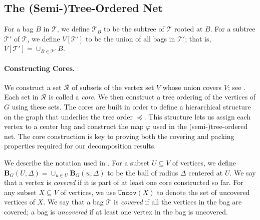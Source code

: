 \documentclass{article}
\newcommand{\mt}{\mathcal{T}}
\def\coreSet{\mathcal{R}}
\def\uncovset{\mathtt{Uncov}}
\def\ball{\mathbf{B}}
\begin{document}
\subsection{The (Semi-)Tree-Ordered Net}\label{subsec:semi-tree-ordered}

 For a bag $B$ in $\mathcal{T}$, we define $\mt_B$ to be the subtree of $\mt$ rooted at $B$. For a subtree $\mt'$ of $\mathcal{T}$, we define $V[\mt']$ to be the union of all bags in $\mt'$; that is, $ V[\mt'] = \cup_{B\in \mt'}B$. 

\medskip
\hypertarget{alg:vertexOrdering}{\paragraph*{Constructing Cores.~}} We construct a set $\coreSet$ of subsets of the vertex set $V$ whose union covers $V$; see .  Each set in $\coreSet$ is called a \emph{core}. We then construct a tree ordering of the vertices of $G$ using these sets. The cores are built in order to define a hierarchical structure on the graph that underlies the tree order $\preceq$. This structure lets us assign each vertex to a center bag and construct the map $\varphi$ used in the (semi-)tree-ordered net. The core construction is key to proving both the covering and packing properties required for our decomposition results.

We describe the notation used in .  For a subset $U\subseteq V$ of vertices, we define $\ball_G(U,\Delta) = \cup_{u\in U}\ball_G(u,\Delta)$ to be the ball of radius $\Delta$ centered at $U$. We say that a vertex is \emph{covered} if it is part of at least one core constructed so far. For any subset  $X\subseteq V$ of vertices, we use $\uncovset(X)$ to denote the set of uncovered vertices of $X$.  We say that a bag $\mathcal{T}$ is \emph{covered} if all the vertices in the bag are covered;  a bag is \emph{uncovered} if at least one vertex in the bag is uncovered.
\end{document}
